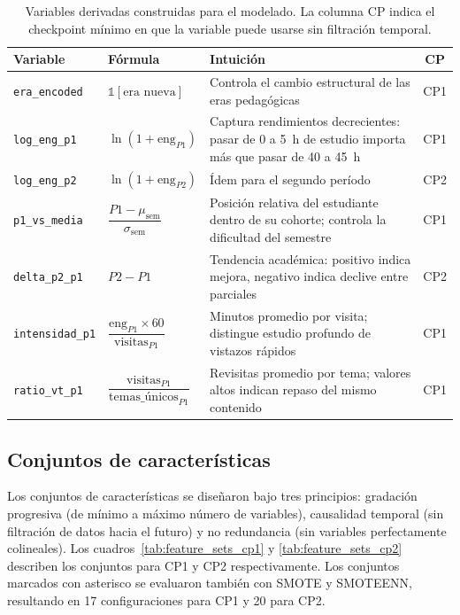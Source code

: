 \documentclass[12pt, letterpaper, openany]{report}
\begin{document}
\begin{table}[htbp]
  \centering
  \caption{Variables derivadas construidas para el modelado. La columna CP indica el checkpoint mínimo en que la variable puede usarse sin filtración temporal.}
  \label{tab:features_derivadas}
  \small
  \begin{tabular}{llp{5.8cm}c}
    \toprule
    Variable & Fórmula & Intuición & CP \\
    \midrule
    \texttt{era\_encoded}
      & $\mathbb{1}[\text{era nueva}]$
      & Controla el cambio estructural de las eras pedagógicas
      & CP1 \\[6pt]
    \texttt{log\_eng\_p1}
      & $\ln(1 + \text{eng}_{P1})$
      & Captura rendimientos decrecientes: pasar de 0 a 5~h de estudio importa más que pasar de 40 a 45~h
      & CP1 \\[6pt]
    \texttt{log\_eng\_p2}
      & $\ln(1 + \text{eng}_{P2})$
      & Ídem para el segundo período
      & CP2 \\[6pt]
    \texttt{p1\_vs\_media}
      & $\dfrac{P1 - \mu_\text{sem}}{\sigma_\text{sem}}$
      & Posición relativa del estudiante dentro de su cohorte; controla la dificultad del semestre
      & CP1 \\[10pt]
    \texttt{delta\_p2\_p1}
      & $P2 - P1$
      & Tendencia académica: positivo indica mejora, negativo indica declive entre parciales
      & CP2 \\[6pt]
    \texttt{intensidad\_p1}
      & $\dfrac{\text{eng}_{P1} \times 60}{\text{visitas}_{P1}}$
      & Minutos promedio por visita; distingue estudio profundo de vistazos rápidos
      & CP1 \\[10pt]
    \texttt{ratio\_vt\_p1}
      & $\dfrac{\text{visitas}_{P1}}{\text{temas\_únicos}_{P1}}$
      & Revisitas promedio por tema; valores altos indican repaso del mismo contenido
      & CP1 \\
    \bottomrule
  \end{tabular}
\end{table}
\FloatBarrier
\subsection{Conjuntos de características}

Los conjuntos de características se diseñaron bajo tres principios: gradación progresiva (de mínimo a máximo número de variables), causalidad temporal (sin filtración de datos hacia el futuro) y no redundancia (sin variables perfectamente colineales). Los cuadros~\ref{tab:feature_sets_cp1} y \ref{tab:feature_sets_cp2} describen los conjuntos para CP1 y CP2 respectivamente. Los conjuntos marcados con asterisco se evaluaron también con SMOTE y SMOTEENN, resultando en 17 configuraciones para CP1 y 20 para CP2.
\end{document}

